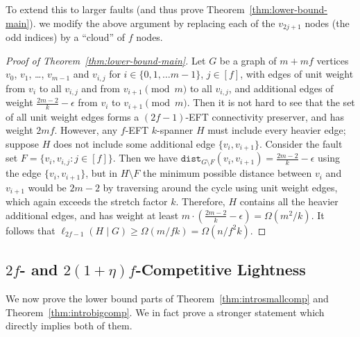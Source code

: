\documentclass{article}
\theoremstyle{plain}
\theoremstyle{definition}
\newcommand{\dist}{\texttt{dist}}
\begin{document}
To extend this to larger faults (and thus prove Theorem~\ref{thm:lower-bound-main}). we modify the above argument by replacing each of the $v_{2j+1}$ nodes (the odd indices) by a ``cloud'' of $f$ nodes.

\begin{proof}[Proof of Theorem~\ref{thm:lower-bound-main}]
    Let $G$ be a graph of $m+mf$ vertices $v_0$, $v_1$, \ldots, $v_{m-1}$ and $v_{i,j}$ for $i \in \{0, 1, \ldots m-1\}$, $j \in [f]$, with edges of unit weight from $v_i$ to all $v_{i,j}$ and from $v_{i+1} \pmod{m}$ to all $v_{i,j}$, and additional edges of weight $\frac{2m-2}{k} - \epsilon$ from $v_i$ to $v_{i+1} \pmod{m}$. Then it is not hard to see that the set of all unit weight edges forms a $(2f-1)$-EFT connectivity preserver, and has weight $2mf$. However, any $f$-EFT $k$-spanner $H$ must include every heavier edge; suppose $H$ does not include some additional edge $\{v_i, v_{i+1}\}$. Consider the fault set $F = \{{v_i, v_{i,j}}: j \in [f]\}$. Then we have $\dist_{G\setminus F} (v_i, v_{i+1}) = \frac{2m-2}{k} - \epsilon$ using the edge $\{v_i, v_{i+1}\}$, but in $H \setminus F$ the minimum possible distance between $v_i$ and $v_{i+1}$ would be $2m-2$ by traversing around the cycle using unit weight edges, which again exceeds the stretch factor $k$. Therefore, $H$ contains all the heavier additional edges, and has weight at least $m\cdot (\frac{2m-2}{k} - \epsilon) = \Omega(m^2/k)$. It follows that $\ell_{2f-1}(H \mid G) \geq \Omega(m/fk) = \Omega(n/f^2k)$. 
\end{proof}

\subsection{$2f$- and $2(1+\eta)f$-Competitive Lightness} \label{sec:lowerbigcompetitive}
We now prove the lower bound parts of Theorem~\ref{thm:introsmallcomp} and Theorem~\ref{thm:introbigcomp}.  We in fact prove a stronger statement which directly implies both of them.
\end{document}
